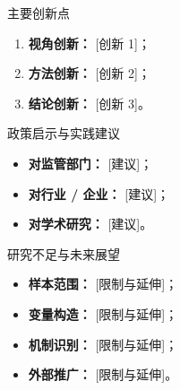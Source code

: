 \documentclass[10pt,aspectratio=169]{beamer}
\begin{document}
\begin{frame}{主要创新点}
  \begin{enumerate}
    \item \textbf{视角创新：} [创新 1]；
    \item \textbf{方法创新：} [创新 2]；
    \item \textbf{结论创新：} [创新 3]。
  \end{enumerate}
\end{frame}

\begin{frame}{政策启示与实践建议}
  \begin{itemize}
    \item \textbf{对监管部门：} [建议]；
    \item \textbf{对行业 / 企业：} [建议]；
    \item \textbf{对学术研究：} [建议]。
  \end{itemize}
\end{frame}

\begin{frame}{研究不足与未来展望}
  \begin{itemize}
    \item \textbf{样本范围：} [限制与延伸]；
    \item \textbf{变量构造：} [限制与延伸]；
    \item \textbf{机制识别：} [限制与延伸]；
    \item \textbf{外部推广：} [限制与延伸]。
  \end{itemize}
\end{frame}
\end{document}
